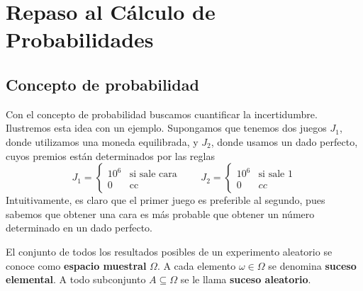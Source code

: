 \documentclass[PREyA.tex]{subfiles}
\begin{document}
\chapter{Repaso al Cálculo de Probabilidades}
\section{Concepto de probabilidad}
Con el concepto de probabilidad buscamos cuantificar la incertidumbre. Ilustremos esta idea con un ejemplo. Supongamos que tenemos dos juegos $J_1$, donde utilizamos una moneda equilibrada, y $J_2$, donde usamos un dado perfecto, cuyos premios están determinados por las reglas
$$
J_1 = \begin{cases}
10^6 &\text{si sale cara}\\
0 & \text{cc}
\end{cases} \qquad J_2 = \begin{cases}
10^6 & \text{si sale 1} \\
0&  cc 
\end{cases}
$$
Intuitivamente, es claro que el primer juego es preferible al segundo, pues sabemos que obtener una cara es más probable que obtener un número determinado en un dado perfecto.

\begin{defi} El conjunto de todos los resultados posibles de un experimento aleatorio se conoce como \textbf{espacio muestral} $\Omega$. A cada elemento $\omega \in \Omega$ se denomina \textbf{suceso elemental}. A todo subconjunto $A\subseteq{\Omega}$ se le llama \textbf{suceso aleatorio}.
\end{defi}
\end{document}
